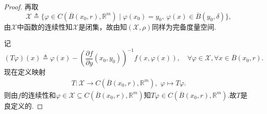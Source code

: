 \documentclass[../../main.tex]{subfiles}%
\begin{document}
\begin{proof}
再取
\[
\mathcal{X} \triangleq \{ \varphi \in C(\overline{B}(x_0, r), \mathbb{R}^m) \mid \varphi(x_0) = y_0,\ \varphi(x) \in \overline{B}(y_0, \delta) \},
\]
由$\mathcal{X}$中函数的连续性知$\mathcal{X}$是闭集，故由知$(\mathcal{X},\rho)$同样为完备度量空间.

记
\[
(T\varphi)(x) \triangleq \varphi(x) - \left( \frac{\partial f}{\partial y}(x_0, y_0) \right)^{-1} f(x, \varphi(x)),\quad \forall \varphi \in \mathcal{X},\forall x\in\overline{B}(x_0,r).
\]
现在定义映射
\begin{align*}
T:\mathcal{X}\to C(\overline{B}(x_0,r),\mathbb{R}^m),\,\,\varphi\mapsto T\varphi.
\end{align*}
则由$f$的连续性和$\varphi\in \mathcal{X}\subseteq C(\overline{B}(x_0, r), \mathbb{R}^m)$知$T\varphi \in C(\overline{B}(x_0, r), \mathbb{R}^m)$.故$T$是良定义的.


\end{proof}
\end{document}
